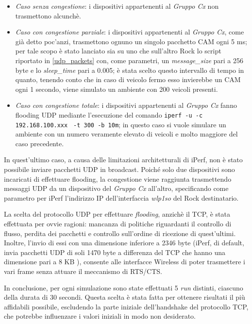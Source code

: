 \begin{itemize}
    \item \textit{Caso senza congestione}: i dispositivi appartenenti al \textit{Gruppo Cx} non trasmettono alcunchè.
    \item \textit{Caso con congestione parziale}: i dispositivi appartenenti al \textit{Gruppo Cx}, come già detto poc'anzi, trasmettono ognuno un singolo pacchetto CAM ogni 5 ms; per tale scopo è stato lanciato sia su uno che sull'altro Rock lo script riportato in \autoref{udp_packets} con, come parametri, un \textit{message\_size} pari a 256 byte e lo \textit{sleep\_time} pari a 0.005; è stata scelto questo intervallo di tempo in quanto, tenendo conto che in caso di veicolo fermo esso invierebbe un CAM ogni 1 secondo, viene simulato un ambiente con 200 veicoli presenti.
    \item \textit{Caso con congestione totale}: i dispositivi appartenenti al \textit{Gruppo Cx} fanno flooding UDP mediante l'esecuzione del comando \verb|iperf -u -c 192.168.100.xxx| \verb| -t 300 -b 10m|; in questo caso si vuole simulare un ambiente con un numero veramente elevato di veicoli e molto maggiore del caso precedente.
\end{itemize}

In quest'ultimo caso, a causa delle limitazioni architetturali di iPerf, non è stato possibile inviare pacchetti UDP in broadcast. Poiché solo due dispositivi sono incaricati di effettuare flooding, la congestione viene raggiunta trasmettendo messaggi UDP da un dispositivo del \textit{Gruppo Cx} all'altro, specificando come parametro per iPerf l'indirizzo IP dell'interfaccia \textit{wlp1so} del Rock destinatario.

La scelta del protocollo UDP per effettuare \textit{flooding}, anzichè il TCP, è stata effettuata per ovvie ragioni: mancanza di politiche riguardanti il controllo di flusso, perdita dei pacchetti e controllo sull'ordine di ricezione di quest'ultimi. Inoltre, l'invio di essi con una dimensione inferiore a 2346 byte (iPerf, di default, invia pacchetti UDP di soli 1470 byte a differenza del TCP che hanno una dimensione pari a 8 KB \cite{iperf}), consente alle interfacce Wireless di poter trasmettere i vari frame senza attuare il meccanismo di RTS/CTS.

In conclusione, per ogni simulazione sono state effettuati 5 \textit{run} distinti, ciascuno della durata di 30 secondi. Questa scelta è stata fatta per ottenere risultati il più affidabili possibile, escludendo la parte iniziale dell'handshake del protocollo TCP, che potrebbe influenzare i valori iniziali in modo non desiderato.


